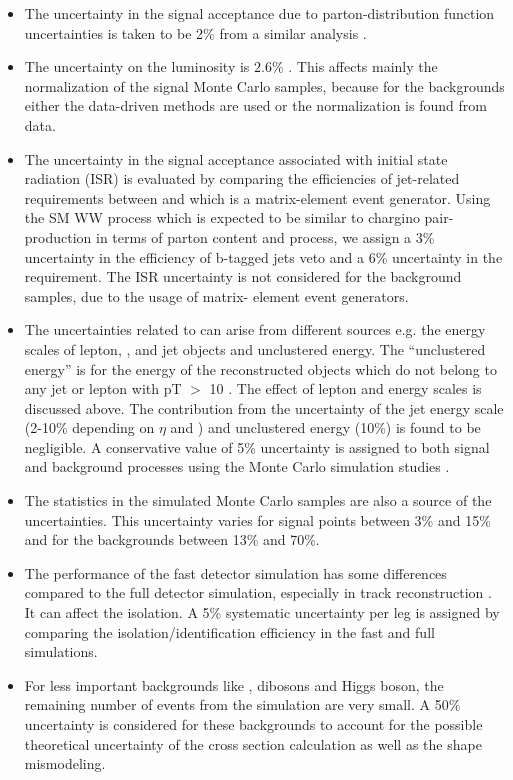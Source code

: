 \begin{itemize}
\item The uncertainty in the signal acceptance due to parton-distribution function uncertainties 
  is taken to be 2\% from a similar analysis \cite{Khachatryan:2014qwa}.

\item The uncertainty on the luminosity  is $2.6\%$ \cite{CMS-PAS-LUM-13-001}.  This affects mainly the
  normalization of the signal Monte Carlo samples, because for the backgrounds  either  the data-driven methods are used or 
the normalization is found from data.

\item The uncertainty in the signal acceptance associated with initial state radiation (ISR)
is evaluated by comparing the efficiencies of jet-related requirements between \PYTHIA
 and \MADGRAPH which is a matrix-element event generator. Using the SM WW process which
 is expected to be similar to chargino pair-production in terms of parton content and process, we assign a 3\% uncertainty in 
the efficiency of  b-tagged jets veto and a 6\% uncertainty in the \deltaphi requirement. The ISR
 uncertainty is not considered for the background samples, due to the usage of matrix-
 element event generators.

\item The uncertainties related to \MPT can arise from different sources e.g.  the energy scales of lepton, \Tau, and jet
objects and unclustered energy.  The ``unclustered energy'' is for the energy of the reconstructed objects which
 do not belong to any jet or lepton with pT $>$ 10 \GeV. The effect of lepton and \Tau
 energy scales is discussed above. The contribution from the uncertainty of the jet energy scale (2-10\% depending on $\eta$  and \PT) and
 unclustered energy (10\%) is found to be negligible. A conservative value of 5\% uncertainty
 is assigned to both signal and background processes using the Monte
 Carlo simulation studies \cite{Khachatryan:2015kxa, Khachatryan:2014qwa}.

\item The statistics in the simulated Monte Carlo samples are also a
  source of the  uncertainties. %
This uncertainty varies for signal points between 3\% and 15\% and for the backgrounds between 13\% and 70\%.

\item The performance of the fast detector simulation has some differences compared to the full detector simulation, especially in
 track reconstruction \cite{Khachatryan:2015kxa}. It can affect the \Tau isolation. A 5\% systematic uncertainty per
 \Tau leg is assigned by comparing the \Tau isolation/identification efficiency in the fast
 and full simulations. 


\item For less important backgrounds like \ttbar,  dibosons and Higgs boson, the remaining number of
events from the simulation are very small. A 50\% uncertainty is considered for these backgrounds to account for the possible theoretical uncertainty of the
cross section calculation as well as the shape mismodeling.
\end{itemize}


